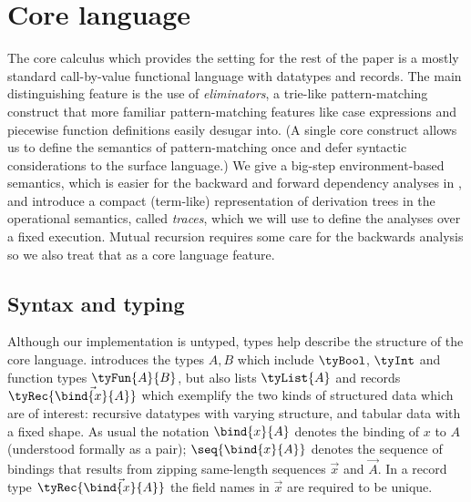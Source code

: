 \section{Core language}
\label{sec:core-language}

The core calculus which provides the setting for the rest of the paper is a mostly standard call-by-value functional language with datatypes and records. The main distinguishing feature is the use of \emph{eliminators}, a trie-like pattern-matching construct that more familiar pattern-matching features like case expressions and piecewise function definitions easily desugar into. (A single core construct allows us to define the semantics of pattern-matching once and defer syntactic considerations to the surface language.) We give a big-step environment-based semantics, which is easier for the backward and forward dependency analyses in , and introduce a compact (term-like) representation of derivation trees in the operational semantics, called \emph{traces}, which we will use to define the analyses over a fixed execution. Mutual recursion requires some care for the backwards analysis so we also treat that as a core language feature.

\subsection{Syntax and typing}
\label{sec:core-language:syntax-typing}

Although our implementation is untyped, types help describe the structure of the core language.  introduces the types $A, B$ which include $\tyBool$, $\tyInt$ and function types $\tyFun{A}{B}$, but also lists $\tyList{A}$ and records $\tyRec{\vec{\bind{x}{A}}}$ which exemplify the two kinds of structured data which are of interest: recursive datatypes with varying structure, and tabular data with a fixed shape. As usual the notation $\bind{x}{A}$ denotes the binding of $x$ to $A$ (understood formally as a pair); $\seq{\bind{x}{A}}$ denotes the sequence of bindings that results from zipping same-length sequences $\vec{x}$ and $\vec{A}$. In a record type $\tyRec{\vec{\bind{x}{A}}}$ the field names in $\vec{x}$ are required to be unique.



